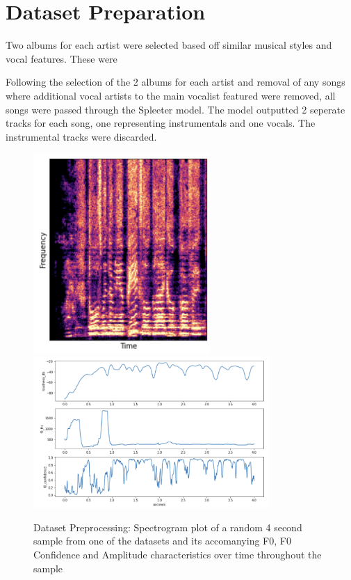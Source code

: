 \section{Dataset Preparation}

Two albums for each artist were selected based off similar musical styles and vocal features. These were 

Following the selection of the 2 albums for each artist and removal of any songs where additional vocal artists to the main vocalist featured were removed, all songs were passed through the Spleeter model\cite{SpleeterPip}\cite{SpleeterPip}. The model outputted 2 seperate tracks for each song, one representing instrumentals and one vocals. The instrumental tracks were discarded.

\begin{figure}
    \centering
    \includegraphics[width=0.6\textwidth]{research/PreprocessingSpecplot.png}
    \includegraphics[width=0.8\textwidth]{research/PreprocessingFeatures.png}
    \caption{Dataset Preprocessing: Spectrogram plot of a random 4 second sample from one of the datasets and its accomanying F0, F0 Confidence and Amplitude characteristics over time throughout the sample}
\end{figure}


